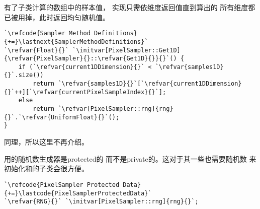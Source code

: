 有了子类计算的数组中的样本值，
实现只需依维度返回值直到算出的
所有维度都已被用掉，此时返回均匀随机值。
\begin{lstlisting}
`\refcode{Sampler Method Definitions}{+=}\lastnext{SamplerMethodDefinitions}`
`\refvar{Float}{}` `\initvar[PixelSampler::Get1D]{\refvar{PixelSampler}{}::\refvar{Get1D}{}}{}`() {
    if (`\refvar{current1DDimension}{}` < `\refvar{samples1D}{}`.size())
        return `\refvar{samples1D}{}`[`\refvar{current1DDimension}{}`++][`\refvar{currentPixelSampleIndex}{}`];
    else
        return `\refvar[PixelSampler::rng]{rng}{}`.`\refvar{UniformFloat}{}`();
}
\end{lstlisting}

{}同理，所以这里不再介绍。

用的随机数生成器是{\ttfamily protected}的
而不是{\ttfamily private}的。这对于其一些也需要随机数
来初始化和的子类会很方便。
\begin{lstlisting}
`\refcode{PixelSampler Protected Data}{+=}\lastcode{PixelSamplerProtectedData}`
`\refvar{RNG}{}` `\initvar[PixelSampler::rng]{rng}{}`;
\end{lstlisting}

